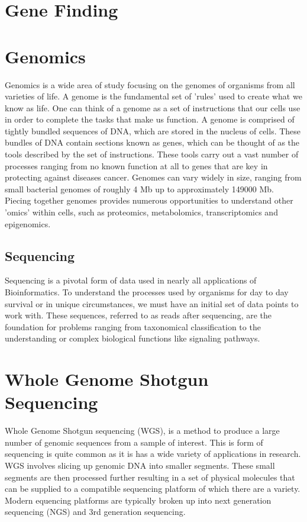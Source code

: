 \section{Gene Finding}
\section{Genomics}
Genomics is a wide area of study focusing on the genomes of organisms
from all varieties of life. A genome is the fundamental set of 'rules'
used to create what we know as life. One can think of a genome as a
set of instructions that our cells use in order to complete the tasks
that make us function. A genome is comprised of tightly bundled
sequences of DNA, which are stored in the nucleus of cells. These
bundles of DNA contain sections known as genes, which can be thought
of as the tools described by the set of instructions. These tools
carry out a vast number of processes ranging from no known function at
all to genes that are key in protecting against diseases
cancer. Genomes can vary widely in size, ranging from small bacterial
genomes of roughly 4 Mb up to approximately 149000 Mb. Piecing
together genomes provides numerous opportunities to understand other
'omics' within cells, such as proteomics, metabolomics,
transcriptomics and epigenomics.

\subsection{Sequencing}
Sequencing is a pivotal form of data used in nearly all applications
of Bioinformatics. To understand the processes used by organisms for
day to day survival or in unique circumstances, we must have an
initial set of data points to work with. These sequences, referred to
as reads after sequencing, are the foundation for problems ranging
from taxonomical classification to the understanding or complex
biological functions like signaling pathways.

\section{Whole Genome Shotgun Sequencing}
Whole Genome Shotgun sequencing (WGS), is a method to produce a large
number of genomic sequences from a sample of interest. This is form of
sequencing is quite common as it is has a wide variety of applications
in research. WGS involves slicing up genomic DNA into smaller
segments. These small segments are then processed further resulting in
a set of physical molecules that can be supplied to a compatible
sequencing platform of which there are a variety. Modern equencing
platforms are typically broken up into next generation sequencing
(NGS) and 3rd generation sequencing.

